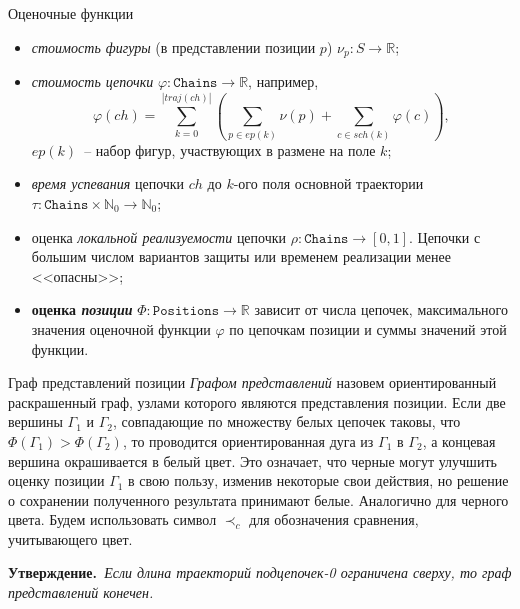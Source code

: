 \documentclass{beamer}
\begin{document}
\begin{frame}{Оценочные функции}
\begin{itemize}
\item \emph{стоимость фигуры} (в представлении позиции $p$) $\nu_{p}:{S} \to \mathbb{R}$;

\item \emph{стоимость цепочки} $\varphi \colon \mathtt{Chains} \to \mathbb{R}$, например,
$$
 \varphi \left( ch \right) = \sum\limits_{k=0}^{|traj(ch)|} \left(  \sum_{ p \in ep\left(k\right)} \nu\left(p\right) + \sum_{c \in sch\left(k\right)} \varphi\left(c\right) \right),
$$
$ep\left(k\right)$~-- набор фигур, участвующих в размене на поле $k$; 
\item \textit{время успевания} цепочки $ch$ до $k$-ого поля основной траектории $\tau \colon  \mathtt{Chains}\times\mathbb{N}_0 \to \mathbb{N}_{0} $;

\item оценка \textit{локальной реализуемости} цепочки $\rho \colon \mathtt{Chains} \to \left[0,1\right]$. Цепочки с большим числом вариантов защиты или временем реализации менее <<опасны>>;

\item \textbf{оценка \textit{позиции}} $\Phi \colon \mathtt{Positions} \to \mathbb{R}$
зависит от числа цепочек, максимального значения оценочной функции $\varphi$ по цепочкам позиции и суммы значений этой функции.
\end{itemize}
\end{frame}


\begin{frame}{Граф представлений позиции}
\textit{Графом представлений} назовем ориентированный раскрашенный граф, узлами которого являются представления позиции. Если две вершины
$\Gamma_{1}$ и $\Gamma_{2}$, совпадающие по множеству белых цепочек
таковы, что $\Phi(\Gamma_1) > \Phi(\Gamma_2)$, то проводится
ориентированная дуга из $\Gamma_1$ в $\Gamma_2$, а
концевая вершина окрашивается в белый цвет. Это означает, что черные могут
улучшить оценку позиции $\Gamma_1$ в свою пользу, изменив некоторые
свои действия, но решение о сохранении полученного результата
принимают белые. Аналогично для черного цвета.
Будем использовать символ $\prec_{c}$ для обозначения сравнения, учитывающего цвет.

{\bf Утверждение.}{\it~Если длина траекторий подцепочек-0 ограничена сверху, то граф представлений конечен.}
\end{frame}
\end{document}
